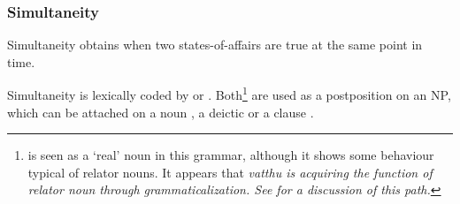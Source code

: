 



\subsubsection{Simultaneity}\label{sec:func:Simultaneity}
Simultaneity obtains when two states-of-affairs are true at the same point in time.

\z

Simultaneity is lexically coded by  or  . Both\footnote{ is
  seen as a `real' noun in this grammar, although it shows some behaviour typical of relator nouns. It appears that \em vatthu \em is acquiring the function of relator noun through grammaticalization. See \citet{DeLancey1997relator} for a discussion of this path.}
are used as a postposition on an NP, which can be attached on a noun , a deictic  or a clause
.



